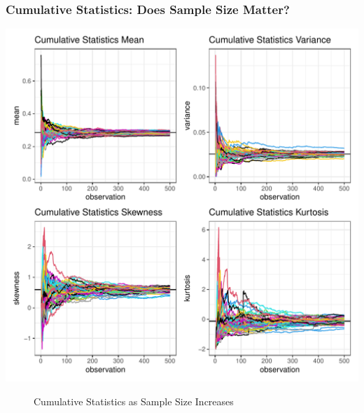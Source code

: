 \documentclass{article}\usepackage[]{graphicx}\usepackage[]{xcolor}
\makeatletter
\def\maxwidth{ %
  \ifdim\Gin@nat@width>\linewidth
    \linewidth
  \else
    \Gin@nat@width
  \fi
}
\newenvironment{knitrout}{}{} %
\makeatother
\begin{document}
\pagebreak
\subsubsection{Cumulative Statistics: Does Sample Size Matter?}

\begin{knitrout}\scriptsize
{}\color{fgcolor}
\includegraphics[width=\maxwidth]{figure/plot3-1} 
\end{knitrout}
\begin{figure}[H]
\begin{center}

\caption{Cumulative Statistics as Sample Size Increases}
\label{cumstats} %
\end{center}
\end{figure}

\pagebreak
\end{document}
